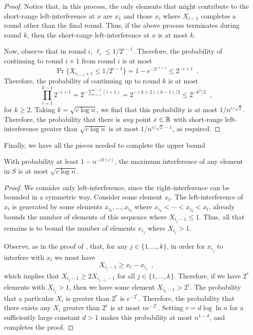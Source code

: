 \documentclass{patmorin}
\begin{document}
\begin{proof}
Notice that, in this process, the only elements that might contribute
to the short-range left-interference at $x$ are $x_1$ and those $x_i$
where $X_{i-1}$ completes a round other than the final round.  Thus,
if the above process terminates during round $k$, then the short-range
left-interference at $x$ is at most $k$.

Now, observe that in round $i$, $\ell_i \le 1/2^{i-1}$.  Therefore,
the probability of continuing to round $i+1$ from round $i$ is at most
\[
   \Pr\{X_{r_{i-1}+1} \le 1/2^{i-1}\} = 1-e^{-2^{-i+1}} \le 2^{-i+1} \enspace .
\]
Therefore, the probability of continuing up to round $k$ is at most
\[
  \prod_{i=1}^{k-1} 2^{-i+1}
  = 2^{-\sum_{i=1}^{k-1}(i+1)}
  = 2^{-(k+2)(k-1)/2} \le 2^{-k^2/2} \enspace ,
\]
for $k\ge 2$.  Taking $k=\sqrt{c\log n}$, we find that this probability
is at most $1/n^{c/\sqrt{2}}$.  Therefore, the probability that there
is \emph{any} point $x\in\mathbb{R}$ with short-range left-interference greater
than $\sqrt{c\log n}$ is at most $1/n^{c/\sqrt{2}-1}$, as required.
\end{proof}


Finally, we have all the pieces needed to complete the upper bound

\begin{lem}
With probability at least $1-n^{-\Omega(c)}$, the maximum interference of
any element in $S$ is at most $\sqrt{c\log n}$.
\end{lem}

\begin{proof}
We consider only left-interference, since the right-interference
can be bounded in a symmetric way.  Consider some element $x_t$.  The
left-interference of $x_t$ is generated by some elements
$x_{i_0},\ldots,x_{i_k}$ where $x_{i_k}<\cdots<
x_{i_0}<x_t$.   already bounds the number of elements of this
sequence where $X_{i_j-1} \le 1$.  Thus, all that remains is to bound
the number of elements $x_{i_j}$ where $X_{i_j} > 1$.

Observe, as in the proof of , that, for any
$j\in\{1,\ldots,k\}$, in order for $x_{i_j}$ to interfere with $x_t$
we must have
\[
   X_{i_j-1} \ge x_t - x_{i_j}
\enspace ,
\]
which implies that $X_{i_j-1} \ge 2 X_{i_{j-1}-1}$ for all
$j\in\{1,\ldots,k\}$.  Therefore, if we have $2^r$ elements with
$X_{i_j}>1$, then we have some element $X_{i_k-1} > 2^r$.  The probability
that a particular $X_i$ is greater than $2^r$ is $e^{-2^r}$. Therefore,
the probability that there exists any $X_i$ greater than $2^r$ is at most
$ne^{-2^r}$.  Setting $r=d\log\ln n$ for a sufficiently large constant
$d>1$ makes this probability at most $n^{1-d}$, and completes the proof.
\end{proof}



\end{document}
